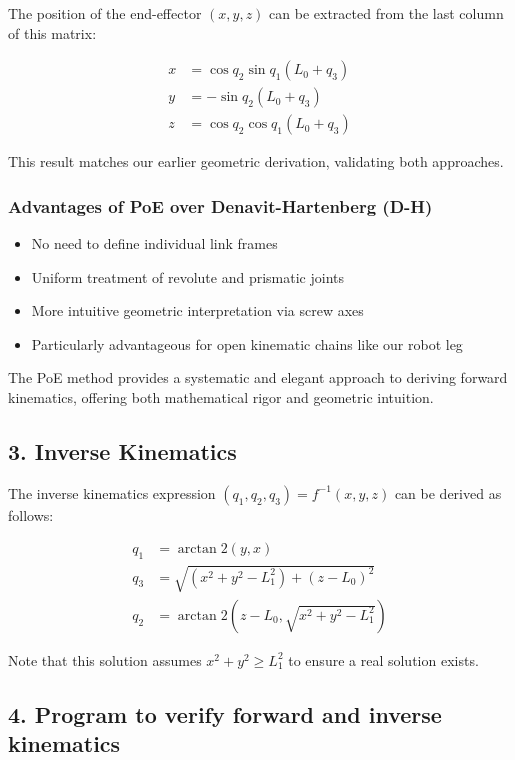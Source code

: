 \begin{solution}
The position of the end-effector $(x, y, z)$ can be extracted from the last column of this matrix:

\begin{align*}
    x &= \cos q_2 \sin q_1 (L_0 + q_3) \\
    y &= -\sin q_2 (L_0 + q_3) \\
    z &= \cos q_2 \cos q_1 (L_0 + q_3)
\end{align*}

This result matches our earlier geometric derivation, validating both approaches.

\subsubsection*{Advantages of PoE over Denavit-Hartenberg (D-H)}
\begin{itemize}
    \item No need to define individual link frames
    \item Uniform treatment of revolute and prismatic joints
    \item More intuitive geometric interpretation via screw axes
    \item Particularly advantageous for open kinematic chains like our robot leg
\end{itemize}

The PoE method provides a systematic and elegant approach to deriving forward kinematics, offering both mathematical rigor and geometric intuition.
	
	\subsection*{3. Inverse Kinematics}
	
	The inverse kinematics expression $(q_1, q_2, q_3) = f^{-1}(x, y, z)$ can be derived as follows:
	
	\begin{align*}
	q_1 &= \arctan2(y, x) \\
	q_3 &= \sqrt{(x^2 + y^2 - L_1^2) + (z - L_0)^2} \\
	q_2 &= \arctan2(z - L_0, \sqrt{x^2 + y^2 - L_1^2})
	\end{align*}
	
	Note that this solution assumes $x^2 + y^2 \geq L_1^2$ to ensure a real solution exists.
	
	\subsection*{4. Program to verify forward and inverse kinematics}
	

\end{solution}
